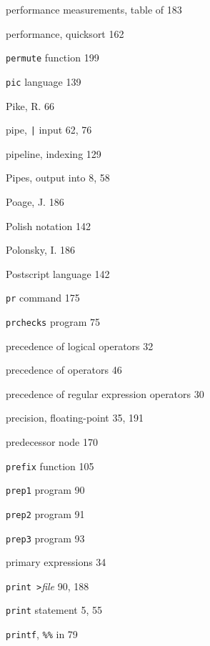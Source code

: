 \begin{multicols}{3}
\hangindent=4pc  performance measurements, table of 183

\hangindent=4pc  performance, quicksort 162

\hangindent=4pc  \verb'permute' function 199

\hangindent=4pc  \verb'pic' language 139

\hangindent=4pc  Pike, R. 66

\hangindent=4pc  pipe, \verb'|' input 62, 76

\hangindent=4pc  pipeline, indexing 129

\hangindent=4pc  Pipes, output into 8, 58

\hangindent=4pc  Poage, J. 186

\hangindent=4pc  Polish notation 142

\hangindent=4pc  Polonsky, I. 186

\hangindent=4pc  Postscript language 142

\hangindent=4pc  \verb'pr' command 175

\hangindent=4pc  \verb'prchecks' program 75

\hangindent=4pc  precedence of logical operators 32

\hangindent=4pc  precedence of operators 46

\hangindent=4pc  precedence of regular expression operators 30

\hangindent=4pc  precision, floating-point 35, 191

\hangindent=4pc  predecessor node 170

\hangindent=4pc  \verb'prefix' function 105

\hangindent=4pc  \verb'prep1' program 90

\hangindent=4pc  \verb'prep2' program 91

\hangindent=4pc  \verb'prep3' program 93

\hangindent=4pc  primary expressions 34

\hangindent=4pc  \verb'print >'\textit{file} 90, 188

\hangindent=4pc  \verb'print' statement 5, 55

\hangindent=4pc  \verb'printf', \verb'%%' in 79


\end{multicols}
